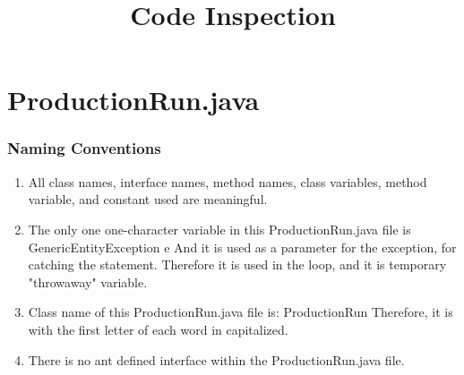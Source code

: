 \documentclass{article}
\title{Code Inspection}
\begin{document}
\section{ProductionRun.java}

\subsubsection{Naming Conventions}
\begin{enumerate}
\item
All class names, interface names, method names, class variables, method variable, and constant used are meaningful.

\item
The only one one-character variable in this ProductionRun.java file is \newline
GenericEntityException e \newline
And it is used as a parameter for the exception, for catching the statement. Therefore it is used in the loop, and it is temporary "throwaway" variable.

\item
Class name of this ProductionRun.java file is: \newline
ProductionRun\newline
Therefore, it is with the first letter of each word in capitalized.

\item
There is no ant defined interface within the ProductionRun.java file.


\end{enumerate}
\end{document}
